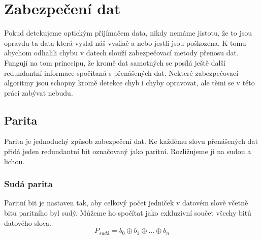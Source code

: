 \section{Zabezpečení dat}
Pokud detekujeme optickým přijímačem data, nikdy nemáme jistotu, že to jsou opravdu ta data která vyslal náš vysílač a nebo jestli jsou poškozena. K tomu abychom odhalili chybu v datech slouží zabezpečovací metody přenosu dat. Fungují na tom princcipu, že kromě dat samotných se posílá ještě další redundantní informace spočítaná s přenášených dat. Nekteré zabezpečovací algoritmy jsou schopny kromě detekce chyb i chyby opravovat, ale těmi se v této práci zabývat nebudu.

\subsection{Parita}
Parita je jednoduchý způsob zabezpečení dat. Ke každému slovu přenášených dat přidá jeden redundantní bit označovaný jako paritní. Rozližujeme ji na sudou a lichou.

\subsubsection{Sudá parita}
Paritní bit je nastaven tak, aby celkový počet jedniček v datovém slově včetně bitu paritního byl sudý. Můžeme ho spočítat jako exkluzivní součet všechy bitů datového slova.
$$ P_{sudá} = b_0 \oplus b_1 \oplus ... \oplus b_n $$

